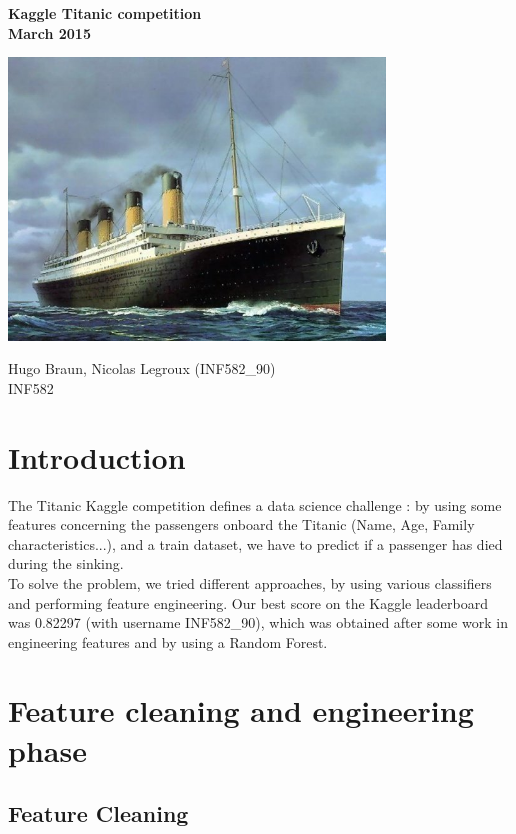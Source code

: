 \documentclass[a4paper,10pt]{article}
\begin{document}
\begin{titlepage}
    \centering
        {\bfseries\Large
        Kaggle Titanic competition\\
        March 2015
        
    }  
     \vfill
     \includegraphics[width=10cm]{titanic.jpg} %
    \vfill
    {\bfseries\Large

        Hugo Braun, Nicolas Legroux (INF582\_90)\\
        \vskip2cm
        INF582
    }    
    \vfill
   
  
\end{titlepage}

\section{Introduction}
The Titanic Kaggle competition defines a data science challenge : by using some features concerning the passengers onboard the Titanic (Name, Age, Family characteristics...), and a train dataset, we have to predict if a passenger has died during the sinking. \\

To solve the problem, we tried different approaches, by using various classifiers and performing feature engineering. Our best score on the Kaggle leaderboard was 0.82297 (with username INF582\_90), which was obtained after some work in engineering features and by using a Random Forest.

\section{Feature cleaning and engineering phase}

\subsection{Feature Cleaning}
\end{document}
